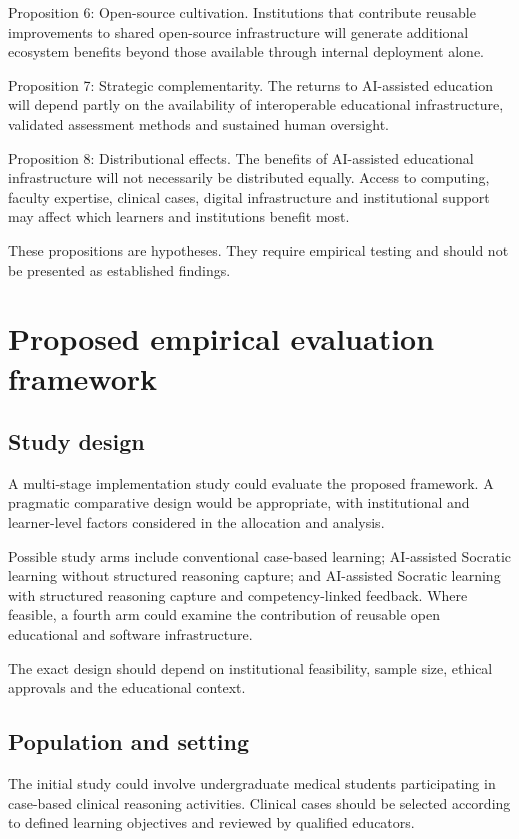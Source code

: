 \documentclass[11pt,a4paper]{article}
\begin{document}
Proposition 6: Open-source cultivation. Institutions that contribute reusable improvements to shared open-source infrastructure will generate additional ecosystem benefits beyond those available through internal deployment alone.

Proposition 7: Strategic complementarity. The returns to AI-assisted education will depend partly on the availability of interoperable educational infrastructure, validated assessment methods and sustained human oversight.

Proposition 8: Distributional effects. The benefits of AI-assisted educational infrastructure will not necessarily be distributed equally. Access to computing, faculty expertise, clinical cases, digital infrastructure and institutional support may affect which learners and institutions benefit most.

These propositions are hypotheses. They require empirical testing and should not be presented as established findings.

\section{Proposed empirical evaluation framework}
\subsection{Study design}
A multi-stage implementation study could evaluate the proposed framework. A pragmatic comparative design would be appropriate, with institutional and learner-level factors considered in the allocation and analysis.

Possible study arms include conventional case-based learning; AI-assisted Socratic learning without structured reasoning capture; and AI-assisted Socratic learning with structured reasoning capture and competency-linked feedback. Where feasible, a fourth arm could examine the contribution of reusable open educational and software infrastructure.

The exact design should depend on institutional feasibility, sample size, ethical approvals and the educational context.

\subsection{Population and setting}
The initial study could involve undergraduate medical students participating in case-based clinical reasoning activities. Clinical cases should be selected according to defined learning objectives and reviewed by qualified educators.
\end{document}
